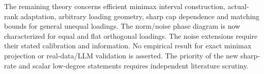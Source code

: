 The remaining theory concerns efficient minimax interval construction, actual-rank adaptation, arbitrary loading geometry, sharp cap dependence and matching bounds for general unequal loadings. The norm/noise phase diagram is now characterized for equal and flat orthogonal loadings. The noise extensions require their stated calibration and information. No empirical result for exact minimax projection or real-data/LLM validation is asserted. The priority of the new sharp-rate and scalar low-degree statements requires independent literature scrutiny.
